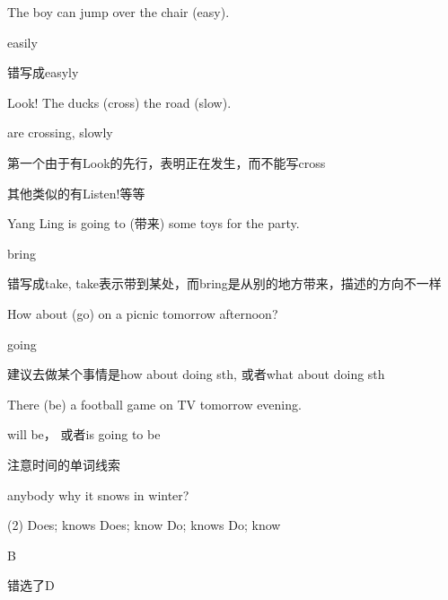 \begin{question}[tags={xiaoxuect}]
The boy can jump over the chair \blank[width=1.4cm]{}(easy).
\end{question}
\begin{solution}
easily

错写成easyly
\end{solution}

\begin{question}[tags={xiaoxuect}]
Look! The ducks \blank[width=1.4cm]{}(cross) the road \blank[width=1cm]{}(slow).
\end{question}
\begin{solution}
are crossing, slowly

第一个由于有Look的先行，表明正在发生，而不能写cross

其他类似的有Listen!等等
\end{solution}


\begin{question}[tags={xiaoxuect}]
Yang Ling is going to \blank[width=1.4cm]{}(带来) some toys for the party.
\end{question}
\begin{solution}
bring

错写成take, take表示带到某处，而bring是从别的地方带来，描述的方向不一样
\end{solution}


\begin{question}[tags={xiaoxuect}]
How about \blank[width=1.4cm]{}(go) on a picnic tomorrow afternoon?
\end{question}
\begin{solution}
going

建议去做某个事情是how about doing sth, 或者what about doing sth
\end{solution}

\begin{question}[tags={xiaoxuect}]
There \blank[width=1.4cm]{}(be) a football game on TV tomorrow evening.
\end{question}
\begin{solution}
will be， 或者is going to be

注意时间的单词线索
\end{solution}

\begin{question}[tags={xiaoxuect}]
\blank*[width=1.4cm]{} anybody \blank[width=1.4cm]{} why it snows in winter?

  \begin{tasks}(2)
    \task Does; knows
    \task Does; know
    \task Do; knows
    \task Do; know
  \end{tasks}

\end{question}
\begin{solution}
B

错选了D
\end{solution}

